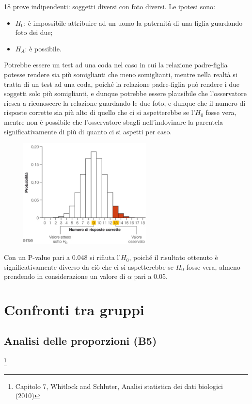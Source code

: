 \documentclass[10pt, draft]{book}
\newcommand{\tightlist}{%
\setlength{\itemsep}{1pt}\setlength{\parskip}{0pt}\setlength{\parsep}{0pt}}
\newcounter{example}[section]
\begin{document}
\begin{example}
    18 prove indipendenti: soggetti diversi con foto diversi.
    Le ipotesi sono:
    \begin{itemize} \tightlist
        \item $H_0$: è impossibile attribuire ad un uomo la paternità di una figlia guardando foto dei due;
        \item $H_A$: è possibile.
    \end{itemize}
    Potrebbe essere un test ad una coda nel caso in cui la relazione padre-figlia potesse rendere sia più somiglianti che meno somiglianti, mentre nella realtà si tratta di un test ad una coda, poiché la relazione padre-figlia può rendere i due soggetti solo più somiglianti, e dunque potrebbe essere plausibile che l'osservatore riesca a riconoscere la relazione guardando le due foto, e dunque che il numero di risposte corrette sia più alto di quello che ci si aspetterebbe se l'$H_0$ fosse vera, mentre non è possibile che l'osservatore sbagli nell'indovinare la parentela significativamente di più di quanto ci si aspetti per caso.
    \begin{figure}[H]\label{fig6.5-1}
    \centering
    \includegraphics[width=0.6\textwidth]{fig6.5-1}
    \caption{\small{}}
    \end{figure}
    Con un P-value pari a 0.048 si rifiuta l'$H_0$, poiché il risultato ottenuto è significativamente diverso da ciò che ci si aspetterebbe se $H_0$ fosse vera, almeno prendendo in considerazione un valore di $\alpha$ pari a 0.05.
\end{example}

\part{Confronti tra gruppi}


\chapter{Analisi delle proporzioni (B5)}\footnote{Capitolo 7, Whitlock and Schluter, Analisi statistica dei dati biologici (2010)}
\end{document}
